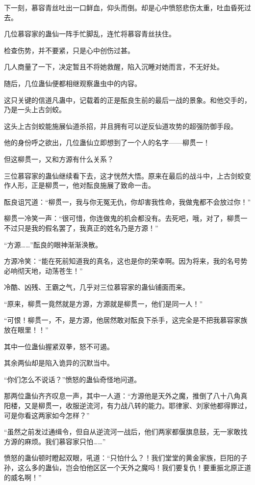 \begin{this_body}
下一刻，慕容青丝吐出一口鲜血，仰头而倒。却是心中愤怒悲伤太重，吐血昏死过去。

几位慕容家的蛊仙一阵手忙脚乱，连忙将慕容青丝扶住。

检查伤势，并不要紧，只是心中创伤过甚。

几人商量了一下，决定暂且不将她救醒，陷入沉睡对她而言，不无好处。

随后，几位蛊仙便都相继观察蛊虫中的内容。

这只关键的信道凡蛊中，记载着的正是酝良生前的最后一战的景象。和他交手的，乃是一头上古剑蛟。

这头上古剑蛟能施展仙道杀招，并且拥有可以逆反仙道攻势的超强防御手段。

他的身份呼之欲出，几位蛊仙立即想到了一个人的名字——柳贯一！

但这柳贯一，又和方源有什么关系？

三位慕容家的蛊仙继续看下去，这才恍然大悟。原来在最后的战斗中，上古剑蛟变作人形，正是柳贯一，他对酝良施展了致命一击。

酝良诅咒道：“柳贯一，我与你无冤无仇，你却害我性命，我做鬼都不会放过你！”

柳贯一冷笑一声：“很可惜，你连做鬼的机会都没有。去死吧，哦，对了，柳贯一不过只是我的假名罢了，我真正的姓名乃是方源！”

“方源……”酝良的眼神渐渐涣散。

方源冷笑：“能在死前知道我的真名，这也是你的荣幸啊。因为将来，我的名号势必响彻天地，动荡苍生！”

冷酷、凶残、王霸之气，几乎对三位慕容家的蛊仙铺面而来。

“原来，柳贯一竟然就是方源，方源就是柳贯一，他们是同一人！”

“可恨！柳贯一，不，是方源，他居然敢对酝良下杀手，这完全是不把我慕容家族放在眼里！！”

其中一位蛊仙握紧双拳，怒不可遏。

其余两仙却是陷入诡异的沉默当中。

“你们怎么不说话？”愤怒的蛊仙奇怪地问道。

那两位蛊仙齐齐叹息一声，其中一人道：“方源他是天外之魔，推倒了八十八角真阳楼，又是柳贯一，收服逆流河，有力战八转的能力。耶律家、刘家他都得罪过，可是你看这两家如今怎样？”

“虽然之前发过通缉令，但自从逆流河一战后，他们两家都偃旗息鼓，无一家敢找方源的麻烦。我们慕容家只怕……”

愤怒的蛊仙顿时瞪起双眼，吼道：“只怕什么？！我们堂堂的黄金家族，巨阳的子孙，这么多的蛊仙，岂会怕他区区一个天外之魔吗！我们要复仇！要重振北原正道的威名啊！”


\end{this_body}
